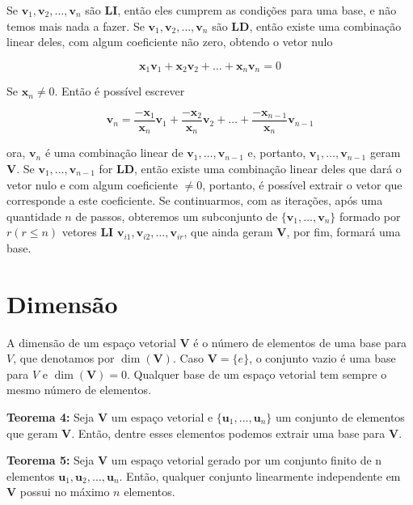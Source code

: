 Se $\mathbf{v}_1, \mathbf{v}_2, \ldots, \mathbf{v}_n$ são \textbf{LI}, então eles cumprem as condições para uma base, e não temos mais nada a fazer. Se $\mathbf{v}_1, \mathbf{v}_2, \ldots, \mathbf{v}_n$ são \textbf{LD}, então existe uma combinação linear deles, com algum coeficiente não zero, obtendo o vetor nulo

\begin{equation}
	\mathbf{x}_1\mathbf{v}_1 + \mathbf{x}_2\mathbf{v}_2 + \ldots + \mathbf{x}_n\mathbf{v}_n = 0
\end{equation}

Se $\mathbf{x}_n \neq 0$. Então é possível escrever

\begin{equation}
	\mathbf{v}_n = \frac{-\mathbf{x}_1}{\mathbf{x}_n}\mathbf{v}_1 + \frac{-\mathbf{x}_2}{\mathbf{x}_n}\mathbf{v}_2 + \ldots + \frac{-\mathbf{x}_{n -1}}{\mathbf{x}_n}\mathbf{v}_{n -1}
\end{equation}

ora, $\mathbf{v}_n$ é uma combinação linear de $\mathbf{v}_1, \ldots, \mathbf{v}_{n -1}$ e, portanto, $\mathbf{v}_1, \ldots, \mathbf{v}_{n -1}$ geram $\mathbf{V}$. Se $\mathbf{v}_1, \ldots, \mathbf{v}_{n -1}$ for \textbf{LD}, então existe uma combinação linear deles que dará o vetor nulo e com algum coeficiente $\neq 0$, portanto, é possível extrair o vetor que corresponde a este coeficiente. Se continuarmos, com as iterações, após uma quantidade $n$ de passos, obteremos um subconjunto de $\{\mathbf{v}_1, \ldots, \mathbf{v}_n\}$ formado por $r(r \leqslant n)$ vetores \textbf{LI} $\mathbf{v}_{i1}, \mathbf{v}_{i2}, \ldots, \mathbf{v}_{ir}$, que ainda geram $\mathbf{V}$, por fim, formará uma base.

\section{Dimensão}
A dimensão de um espaço vetorial $\mathbf{V}$ é o número de elementos de uma base para $V$, que denotamos por $\dim(\mathbf{V})$. Caso $\mathbf{V} = \{e\}$, o conjunto vazio é uma base para $V$ e $\dim(\mathbf{V}) = 0$. Qualquer base de um espaço vetorial tem sempre o mesmo número de elementos.

\noindent\textbf{Teorema 4:} Seja  $\mathbf{V}$ um espaço vetorial e $\{\mathbf{u}_1, \ldots, \mathbf{u}_n\}$ um conjunto de elementos que geram  $\mathbf{V}$. Então, dentre esses elementos podemos extrair uma base para $\mathbf{V}$.

\noindent\textbf{Teorema 5:} Seja $\mathbf{V}$ um espaço vetorial gerado por um conjunto finito de n elementos $\mathbf{u}_1, \mathbf{u}_2, \ldots, \mathbf{u}_n$. Então, qualquer conjunto linearmente independente em $\mathbf{V}$ possui no máximo $n$ elementos.

